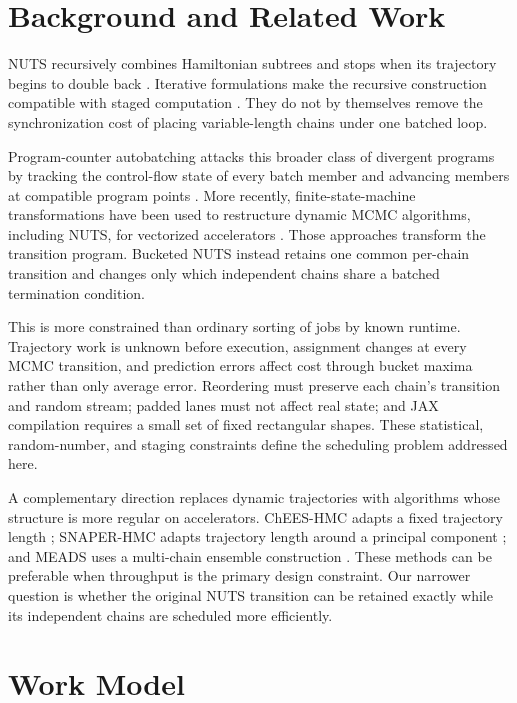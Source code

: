 \documentclass[conference]{IEEEtran}
\begin{document}
\section{Background and Related Work}

NUTS recursively combines Hamiltonian subtrees and stops when its trajectory
begins to double back \cite{hoffman2014nuts}.  Iterative formulations make the
recursive construction compatible with staged computation
\cite{lao2020tfpmcmc}.  They do not by themselves remove the synchronization
cost of placing variable-length chains under one batched loop.

Program-counter autobatching attacks this broader class of divergent programs
by tracking the control-flow state of every batch member and advancing members
at compatible program points \cite{radul2020autobatching}.  More recently,
finite-state-machine transformations have been used to restructure dynamic MCMC
algorithms, including NUTS, for vectorized accelerators \cite{dance2025fsm}.
Those approaches transform the transition program.  Bucketed NUTS instead
retains one common per-chain transition and changes only which independent
chains share a batched termination condition.

This is more constrained than ordinary sorting of jobs by known runtime.
Trajectory work is unknown before execution, assignment changes at every MCMC
transition, and prediction errors affect cost through bucket maxima rather than
only average error.  Reordering must preserve each chain's transition and random
stream; padded lanes must not affect real state; and JAX compilation requires a
small set of fixed rectangular shapes.  These statistical, random-number, and
staging constraints define the scheduling problem addressed here.

A complementary direction replaces dynamic trajectories with algorithms whose
structure is more regular on accelerators.  ChEES-HMC adapts a fixed trajectory
length \cite{hoffman2021chees}; SNAPER-HMC adapts trajectory length around a
principal component \cite{sountsov2022snaper}; and MEADS uses a multi-chain
ensemble construction \cite{hoffman2022meads}.  These methods can be preferable
when throughput is the primary design constraint.  Our narrower question is
whether the original NUTS transition can be retained exactly while its
independent chains are scheduled more efficiently.

\section{Work Model}
\label{sec:work-model}
\end{document}
